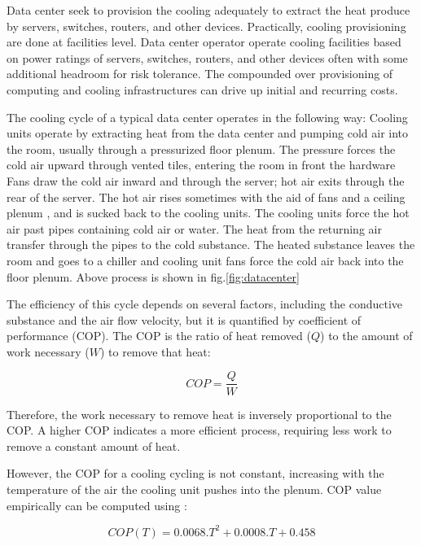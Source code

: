 \documentclass[JIP]{ipsj}
\begin{document}
Data center seek to provision the cooling adequately to extract the heat produce by servers, switches, routers, and other devices.
Practically, cooling provisioning are done at facilities level.
Data center operator operate cooling facilities based on power ratings of servers, switches, routers, and other devices often with some additional headroom for risk tolerance. 
The compounded over provisioning of computing and cooling infrastructures can drive up initial and recurring costs. 

The cooling cycle of a typical data center operates in the following way:
Cooling units operate by extracting heat from the data center and pumping cold air into the room, usually through a pressurized floor plenum.
The pressure forces the cold air upward through vented tiles, entering the room in front the hardware
Fans draw the cold air inward and through the server; hot air exits through the rear of the server.
The hot air rises sometimes with the aid of fans and a ceiling plenum , and is sucked back to the cooling units.
The cooling units force the hot air past pipes containing cold air or water. 
The heat from the returning air transfer through the pipes to the cold substance. 
The heated substance leaves the room and goes to a chiller and cooling unit fans force the cold air back into the floor plenum. 
Above process is shown in fig.\ref{fig:datacenter}

The efficiency of this cycle depends on several factors, including the conductive substance and the air flow velocity, but it is quantified by coefficient of performance (COP).
The COP is the ratio of heat removed ($Q$) to the amount of work necessary ($W$) to remove that heat:

\begin{equation}\label{eqn:cop}
	COP=\frac{Q}{W}
\end{equation}

Therefore, the work necessary to remove heat is inversely proportional to the COP.  
A higher COP indicates a more efficient process, requiring less work to remove a constant amount of heat.

However, the COP for a cooling cycling is not constant, increasing with the temperature of the air the cooling unit pushes into the plenum.  
COP value empirically can be computed using \cite{moore2005making}:

\begin{equation}\label{eqn:copt}
	COP(T) = 0.0068.T^2 + 0.0008.T + 0.458
\end{equation}
\end{document}
